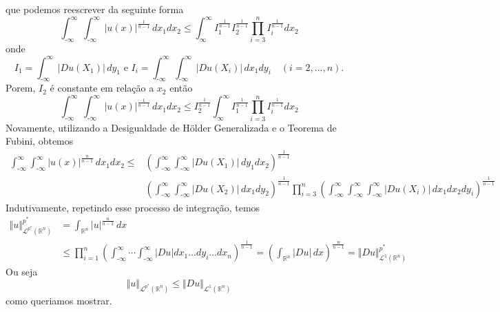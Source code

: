 \documentclass[a4paper, 11pt]{book}
\theoremstyle{definition}
\newcommand{\m}{\text{-}}
\newcommand{\bR}{\mathbb{R}}
\newcommand{\cL}{\mathcal{L}}
\begin{document}
\begin{prf}
\[    \]
    que podemos reescrever da seguinte forma
    \[
        \int_{\m\infty}^{\infty}\int_{\m\infty}^{\infty} |u(x)|^{\frac{1}{n-1}} \,dx_1dx_2 \leqslant \int_{\infty}^{\infty} I_1^{\frac{1}{n-1}}I_2^{\frac{1}{n-1}}\prod_{i=3}^n I_i^{\frac{1}{n-1}} \!dx_2
    \]
    onde
    \[
        I_1 = \int_{\m\infty}^{\infty} |Du(X_1)| \,dy_1 \text{ e } I_i = \int_{\m\infty}^{\infty} \!\int_{\m\infty}^{\infty} |Du(X_i)| \, dx_1dy_i \quad(i = 2,\dots,n).
    \]
    Porem, $I_2$ é constante em relação a $x_2$ então
    \[
        \int_{\m\infty}^{\infty}\int_{\m\infty}^{\infty} |u(x)|^{\frac{1}{n-1}} \,dx_1dx_2 \leqslant I_2^{\frac{1}{n-1}}\int_{\infty}^{\infty} I_1^{\frac{1}{n-1}}\prod_{i=3}^n I_i^{\frac{1}{n-1}} \!dx_2
    \]
    Novamente, utilizando a Desigualdade de Hölder Generalizada e o Teorema de Fubini, obtemos
    \small{
    \[
        \begin{aligned}
            \int_{\m\infty}^{\infty}\int_{\m\infty}^{\infty} |u(x)|^{\frac{n}{n-1}} \,dx_1dx_2 \leqslant &\left( \int_{\m\infty}^{\infty} \int_{\m\infty}^{\infty} |Du(X_1)| \,dy_1 dx_2 \right)^{\frac{1}{n-1}}\\ &\left( \int_{\m\infty}^{\infty} \int_{\m\infty}^{\infty} |Du(X_2)| \,dx_1 dy_2 \right)^{\frac{1}{n-1}} \prod_{i=3}^n \left( \int_{\m\infty}^{\infty}\int_{\m\infty}^{\infty}\int_{\m\infty}^{\infty} |Du(X_i)| \,dx_1dx_2dy_i \right)^{\frac{1}{n-1}} 
        \end{aligned}
    \]\!}
    Indutivamente, repetindo esse processo de integração, temos
    \[
        \begin{aligned}
            \Vert u \Vert_{\cL^{p^*}(\bR^n)}^{p^*} &= \int_{\bR^n} |u|^{\frac{n}{n-1}} \, dx \\
            &\leqslant \prod_{i=1}^n \left( \int_{\m\infty}^{\infty} \cdots \int_{\m\infty}^\infty |Du| dx_1\dots dy_i \dots dx_n \right)^{\frac{1}{n-1}}
            = \left(\int_{\bR^n} |Du|\,dx\right)^{\frac{n}{n-1}} = \Vert Du \Vert_{\cL^1(\bR^n)}^{p^*}
        \end{aligned}
    \]
    Ou seja
    \begin{equation} \label{eq:desigualdadegnss}
        \Vert u \Vert_{\cL^{p^*}(\bR^n)} \leqslant\Vert Du \Vert_{\cL^1(\bR^n)}
    \end{equation}
    como queriamos mostrar.


\end{prf}
\end{document}
